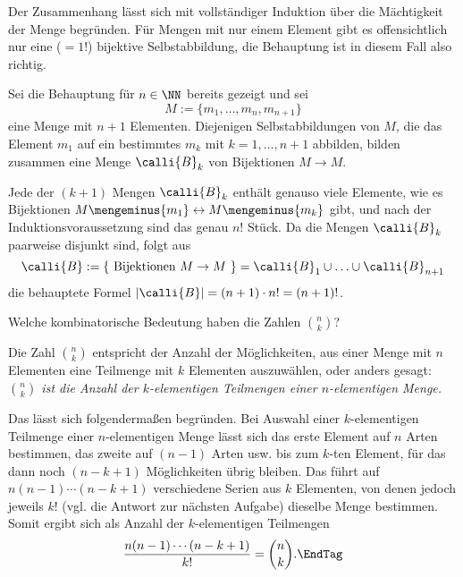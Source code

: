 \begin{antwort}
  Der Zusammenhang lässt sich mit vollständiger Induktion 
  über die Mächtigkeit der Menge begründen.  
  Für Mengen mit nur einem Element gibt es offensichtlich nur eine ($=1!$) 
  bijektive Selbstabbildung, die Behauptung ist in diesem Fall also richtig. 

  Sei die Behauptung für $n\in \NN$ bereits gezeigt und sei 
  \[
  M := \{ m_1, \ldots, m_n, m_{n+1} \}
  \] 
  eine Menge mit $n+1$ Elementen. 
  Diejenigen Selbstabbildungen von $M$, die das Element $m_1$ 
  auf ein bestimmtes $m_k$ mit $k=1,\ldots,n+1$ abbilden, bilden 
  zusammen eine Menge $\calli{B}_k$ von Bijektionen $M\to M$. 

  Jede der $(k+1)$ Mengen $\calli{B}_k$ enthält genauso viele Elemente, 
  wie es Bijektionen 
  $M \mengeminus \{m_1\} \leftrightarrow M \mengeminus \{ m_k \}$ gibt,  
  und nach der Induktionsvoraussetzung sind das genau $n!$ Stück. 
  Da die Mengen $\calli{B}_k$ paarweise disjunkt sind, folgt aus
  \[
  \calli{B}:=\{ \text{ Bijektionen $ M\to M$ } \} = 
  \calli{B}_1 \cup \ldots \cup \calli{B}_{n+1}
  \]  
  die behauptete Formel $|\calli{B}|=(n+1)\cdot n!=(n+1)!$.
  \AntEnd
\end{antwort}

\begin{frage}
  Welche kombinatorische Bedeutung haben die Zahlen $\binom{n}{k}$?
\end{frage}

\begin{antwort}
  Die Zahl $\binom{n}{k}$ entspricht der Anzahl der Möglichkeiten, aus einer 
  Menge mit $n$ Elementen eine Teilmenge mit $k$ Elementen auszuwählen, oder 
  anders gesagt:    
  \textit{$\binom{n}{k}$ ist die Anzahl der $k$-elementigen 
    Teilmengen einer $n$-elementigen Menge.}

  Das lässt sich folgendermaßen begründen. 
  Bei Auswahl einer $k$-elementigen Teilmenge einer 
  $n$-elementigen Menge lässt sich das erste Element auf $n$ Arten bestimmen, 
  das zweite auf $(n-1)$ Arten usw. bis zum $k$-ten Element, für 
  das dann noch $(n-k+1)$ Möglichkeiten übrig bleiben. Das führt auf  
  $n(n-1) \cdots (n-k+1)$ verschiedene Serien aus $k$ Elementen, 
  von denen jedoch jeweils $k!$ (vgl. die 
  Antwort zur nächsten Aufgabe) dieselbe Menge bestimmen. Somit ergibt sich als 
  Anzahl der $k$-elementigen Teilmengen 
  \begin{equation}
    \frac{ n(n-1)\cdots (n-k+1)}{k!} = \binom{n}{k}. \EndTag
  \end{equation}
\end{antwort}



